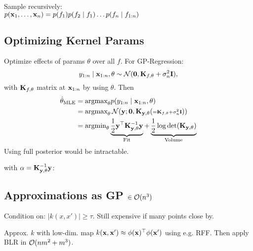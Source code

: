 \begin{definition}
    Sample recursively: \\
    \(p(\vb{x}_1, \ldots, \vb{x}_n) = p(f_1)p(f_2 \mid f_1)\ldots p(f_n \mid f_{1:n})\)
\end{definition}

\subsection{Optimizing Kernel Params}

\begin{definition}
    Optimize effects of params \(\theta\) over all \(f\). For GP-Regression:
    \[y_{1:n} \mid \vb{x}_{1:n}, \theta \sim \operatorname{\mathcal{N}}(\vb{0}, \vb{K}_{f, \theta} + \sigma_n^2\vb{I}),\]
    with \(\vb{K}_{f, \theta}\) matrix at \(\vb{x}_{1:n}\) by using \(\theta\). Then
    \begin{align*}
        \hat\theta_{\text{MLE}} &= \text{argmax}_{\theta} p(y_{1:n} \mid \vb{x}_{1:n}, \theta) \\
        &=\text{argmax}_{\theta} \operatorname{\mathcal{N}}(\vb{y}; \vb{0}, \vb{K}_{\vb{y}, \theta} ({\scriptstyle = \vb{K}_{f, \theta} + \sigma_n^2\vb{I}})) \\
        &= \text{argmin}_{\theta} \underbrace{\frac{1}{2}\vb{y}^\top \vb{K}_{\vb{y}, \theta}^{-1} \vb{y}}_{\text{Fit}} + \underbrace{\frac{1}{2} \log\det(\vb{K}_{\vb{y}, \theta})}_{\text{Volume}}
    \end{align*}
    Using full posterior would be intractable.
\end{definition}

\begin{definition}
    with \(\vb{\alpha} = \vb{K}_{\vb{y}, \theta}^{-1}\vb{y}\):

\end{definition}

\subsection{Approximations as GP \(\in \mathcal{O}(n^3)\)}

\begin{definition}
    Condition on: \(|k(x, x')| \geq \tau\). Still expensive if many points close by.
\end{definition}

\begin{definition}
    Approx. \(k\) with low-dim. map  \(k(\vb{x},\vb{x}') \approx \phi(\vb{x})^\top\phi(\vb{x}')\) using e.g. RFF.
    Then apply BLR in \(\mathcal{O}(nm^2 + m^3)\).
\end{definition}

